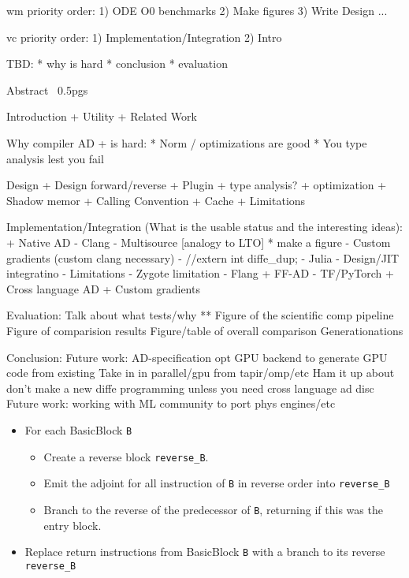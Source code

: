wm priority order:
1) ODE O0 benchmarks
2) Make figures
3) Write Design
...

vc priority order:
1) Implementation/Integration
2) Intro

TBD:
* why is hard
* conclusion
* evaluation

Abstract ~0.5pgs

Introduction
+ Utility
+ Related Work

Why compiler AD + is hard:
* Norm / optimizations are good 
* You type analysis lest you fail 

Design
 + Design forward/reverse
 + Plugin
 + type analysis?
 + optimization
 + Shadow memor
 + Calling Convention
 + Cache
 + Limitations

Implementation/Integration (What is the usable status and the interesting ideas):
 + Native AD
   - Clang
     - Multisource [analogy to LTO]
       * make a figure 
     - Custom gradients (custom clang necessary)
     - //extern int diffe\_dup;
   - Julia
     - Design/JIT integratino
     - Limitations
     - Zygote limitation \wmnote{}
   - Flang
 + FF-AD
   - TF/PyTorch 
 + Cross language AD
 + Custom gradients

Evaluation:
 Talk about what tests/why ** 
 Figure of the scientific comp pipeline
 Figure of comparision results 
 Figure/table of overall comparison 
 Generationations
 
Conclusion:
 Future work: AD-specification opt
 GPU backend to generate GPU code from existing
 Take in in parallel/gpu from tapir/omp/etc
 Ham it up about don't make a new diffe programming unless you need
 cross language ad disc
 Future work: working with ML community to port phys engines/etc
 
 




\begin{itemize}
    \item For each BasicBlock \texttt{B}
    \begin{itemize}
        \item Create a reverse block \texttt{reverse\_B}.
        \item Emit the adjoint for all instruction of \texttt{B} in reverse order into \texttt{reverse\_B}
        \item Branch to the reverse of the predecessor of \texttt{B}, returning if this was the entry block.
    \end{itemize}
    \item Replace return instructions from BasicBlock \texttt{B} with a branch to its reverse \texttt{reverse\_B}
\end{itemize}
